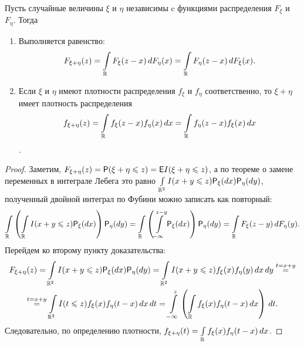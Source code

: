 \begin{lemma}[о свертке]
	Пусть случайные величины $\xi$ и $\eta$ независимы c функциями распределения $F_\xi$ и $F_\eta$. Тогда
	\begin{enumerate}
	    \item Выполняется равенство: $$ F_{\xi + \eta} (z) = \int\limits_{\mathbb{R}} F_\xi (z - x) \, dF_\eta (x) = \int\limits_{\mathbb{R}} F_\eta(z - x) \, d F_\xi(x).$$
	    \item Если $\xi$ и $\eta$ имеют плотности распределения $f_\xi$ и $f_\eta$ соответственно, то $\xi + \eta$ имеет плотность распределения $$f_{\xi + \eta} (z) = \int\limits_{\mathbb{R}} f_\xi (z - x) f_\eta (x) \, dx = \int\limits_{\mathbb{R}} f_\eta (z - x) f_\xi(x) \, dx$$.
	\end{enumerate} 
	
	\begin{proof}
		Заметим, $F_{\xi + \eta} (z) = \mathsf{P} ( \xi + \eta \leqslant z) = \mathsf{E} I(\xi + \eta \leqslant z)$, а по теореме о замене переменных в интеграле Лебега это равно $\int\limits_{\mathbb{R}^2} I(x + y \leqslant z) \mathsf{P}_\xi(dx) \mathsf{P}_\eta(dy)$, полученный двойной интеграл по Фубини можно записать как повторный:
		$$ \int\limits_{\mathbb{R}} \left( \int\limits_{\mathbb{R}} I(x + y \leqslant z) \mathsf{P}_\xi(dx) \right) \mathsf{P}_\eta(dy) = \int\limits_{\mathbb{R}} \left( \int\limits_{-\infty}^{z-y} \mathsf{P}_\xi(dx) \right) \mathsf{P}_\eta(dy) = \int\limits_{\mathbb{R}} F_\xi(z - y) \, dF_\eta(y).$$
		Перейдем ко второму пункту доказательства:
		\begin{multline*}
			F_{\xi + \eta} (z) = \int\limits_{\mathbb{R}^2} I(x + y \leqslant z) \mathsf{P}_\xi(dx) \mathsf{P}_\eta(dy) = \int\limits_{\mathbb{R}^2} I(x + y \leqslant z) f_\xi(x) f_\eta(y) \, dx\,dy \overset{t = x+y}{=} \\ \overset{t = x+y}{=} \int\limits_{\mathbb{R}^2} I(t \leqslant z) f_\xi(x) f_\eta(t - x) \, dx\,dt = \int\limits_{-\infty}^z \left( \int\limits_{\mathbb{R}} f_\xi(x) f_\eta(t-x) \, dx \right) \, dt.
		\end{multline*}
		Следовательно, по определению плотности, $f_{\xi+\eta}(t) = \int\limits_{\mathbb{R}} f_\xi(x) f_\eta(t-x) \, dx$.
	\end{proof}
\end{lemma}